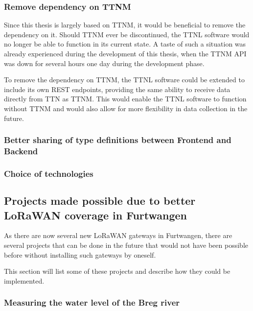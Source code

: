 
\subsubsection{Remove dependency on \acl{TTNM}}

Since this thesis is largely based on \ac{TTNM}, it would be beneficial to remove the dependency on it.
Should \ac{TTNM} ever be discontinued, the \ac{TTNL} software would no longer be able to function in its current state.
A taste of such a situation was already experienced during the development of this thesis, when the \ac{TTNM} \ac{API} was down for several hours one day during the development phase.

To remove the dependency on \ac{TTNM}, the \ac{TTNL} software could be extended to include its own \ac{REST} endpoints, providing the same ability to receive data directly from \ac{TTN} as \ac{TTNM}.
This would enable the \ac{TTNL} software to function without \ac{TTNM} and would also allow for more flexibility in data collection in the future.

\subsubsection{Better sharing of type definitions between Frontend and Backend}

\subsubsection{Choice of technologies}

\subsection{Projects made possible due to better \acs{LoRaWAN} coverage in Furtwangen}

As there are now several new \ac{LoRaWAN} gateways in Furtwangen, there are several projects that can be done in the future that would not have been possible before without installing such gateways by oneself.

This section will list some of these projects and describe how they could be implemented.

\subsubsection{Measuring the water level of the Breg river}


